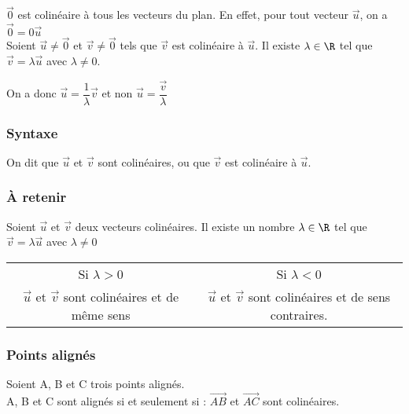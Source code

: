 $\overrightarrow{0}$ est colinéaire à tous les vecteurs du plan. En effet, pour tout vecteur $\overrightarrow{u}$, on a $\overrightarrow{0} = 0 \overrightarrow{u}$ \\

Soient $\overrightarrow{u} \neq \overrightarrow{0}$ et $\overrightarrow{v} \neq \overrightarrow{0}$ tels que $\overrightarrow{v}$ est colinéaire à $\overrightarrow{u}$. Il existe $ \lambda \in \R $ tel que $\overrightarrow{v} = \lambda\overrightarrow{u}$ avec $\lambda \neq 0 $.

On a donc $\overrightarrow{u} = \dfrac{1}{\lambda}\overrightarrow{v}$ et non $\overrightarrow{u} = \dfrac{\overrightarrow{v}}{\lambda}$

\subsubsection{Syntaxe}

On dit que $\overrightarrow{u}$ et $\overrightarrow{v}$ sont colinéaires, ou que $\overrightarrow{v}$ est colinéaire à  $\overrightarrow{u}$. 

\subsubsection{À retenir}

Soient $\overrightarrow{u}$ et $ \overrightarrow{v} $ deux vecteurs 
colinéaires. Il existe un nombre $\lambda \in \R $ tel que $ \overrightarrow{v} = \lambda \overrightarrow{u} $ avec $ \lambda \neq 0$ \\

\begin{tabular}{c|c}

Si $\lambda > 0 $ & Si $\lambda < 0$ \\
$\overrightarrow{u}$ et $\overrightarrow{v}$ sont colinéaires et de même sens & $\overrightarrow{u}$ et $\overrightarrow{v}$ sont colinéaires et de sens contraires.

\end{tabular}

\subsubsection{Points alignés}

Soient A, B et C trois points alignés.\\

A, B et C sont alignés si et seulement si : $ \overrightarrow{AB}$ et $\overrightarrow{AC}$ sont colinéaires.

